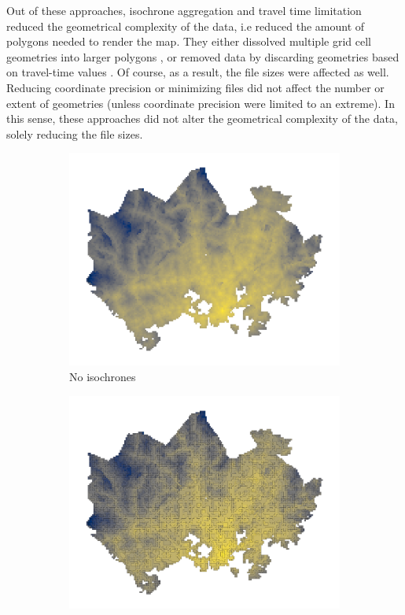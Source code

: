 Out of these approaches, isochrone aggregation and travel time limitation reduced
the geometrical complexity of the data, i.e reduced the amount of polygons needed to render the map.
They either dissolved multiple grid cell geometries into larger polygons ,
or removed data by discarding geometries based on travel-time values .
Of course, as a result, the file sizes were affected as well.
Reducing coordinate precision or minimizing files did not affect the number or extent of geometries
(unless coordinate precision were limited to an extreme).
In this sense, these approaches did not alter the geometrical complexity of the data,
solely reducing the file sizes.

\begin{figure}[H]
	\centering
	\begin{subfigure}[b]{0.5\textwidth}
		\includegraphics[width=\textwidth]{visual/figures/ttm/isochrone_interval_1}
		\caption{No isochrones}
		\label{fig:interval 1}
	\end{subfigure}%
	\hfill
	\begin{subfigure}[b]{0.5\textwidth}
		\includegraphics[width=\textwidth]{visual/figures/ttm/isochrone_interval_5}

\end{subfigure}
\end{figure}
